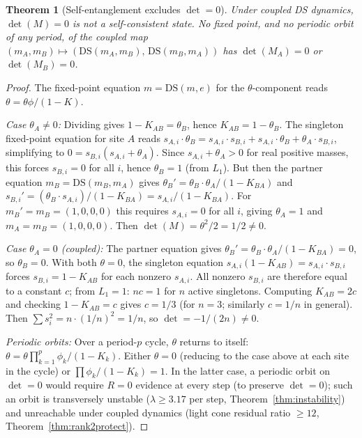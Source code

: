 \documentclass[11pt,a4paper]{article}
\newtheorem{theorem}{Theorem}[section]
\theoremstyle{definition}
\theoremstyle{remark}
\begin{document}
\begin{theorem}[Self-entanglement excludes $\det=0$]\label{thm:selfentangle}
Under coupled DS dynamics, $\det(M)=0$ is not a self-consistent state. No fixed point, and no periodic orbit of any period, of the coupled map $(m_A,m_B)\mapsto(\mathrm{DS}(m_A,m_B),\,\mathrm{DS}(m_B,m_A))$ has $\det(M_A)=0$ or $\det(M_B)=0$.
\end{theorem}

\begin{proof}
The fixed-point equation $m=\mathrm{DS}(m,e)$ for the $\theta$-component reads $\theta=\theta\phi/(1-K)$.

\emph{Case $\theta_A\neq 0$:} Dividing gives $1-K_{AB}=\theta_B$, hence $K_{AB}=1-\theta_B$. The singleton fixed-point equation for site $A$ reads $s_{A,i}\cdot\theta_B=s_{A,i}\cdot s_{B,i}+s_{A,i}\cdot\theta_B+\theta_A\cdot s_{B,i}$, simplifying to $0=s_{B,i}(s_{A,i}+\theta_A)$. Since $s_{A,i}+\theta_A>0$ for real positive masses, this forces $s_{B,i}=0$ for all $i$, hence $\theta_B=1$ (from $L_1$). But then the partner equation $m_B=\mathrm{DS}(m_B,m_A)$ gives $\theta_B'=\theta_B\cdot\theta_A/(1-K_{BA})$ and $s_{B,i}'=(\theta_B\cdot s_{A,i})/(1-K_{BA})=s_{A,i}/(1-K_{BA})$. For $m_B'=m_B=(1,0,0,0)$ this requires $s_{A,i}=0$ for all $i$, giving $\theta_A=1$ and $m_A=m_B=(1,0,0,0)$. Then $\det(M)=\theta^2/2=1/2\neq 0$.

\emph{Case $\theta_A=0$ (coupled):} The partner equation gives $\theta_B'=\theta_B\cdot\theta_A/(1-K_{BA})=0$, so $\theta_B=0$. With both $\theta=0$, the singleton equation $s_{A,i}(1-K_{AB})=s_{A,i}\cdot s_{B,i}$ forces $s_{B,i}=1-K_{AB}$ for each nonzero $s_{A,i}$. All nonzero $s_{B,i}$ are therefore equal to a constant $c$; from $L_1=1$: $nc=1$ for $n$ active singletons. Computing $K_{AB}=2c$ and checking $1-K_{AB}=c$ gives $c=1/3$ (for $n=3$; similarly $c=1/n$ in general). Then $\sum s_i^2 = n\cdot(1/n)^2=1/n$, so $\det=-1/(2n)\neq 0$.

\emph{Periodic orbits:} Over a period-$p$ cycle, $\theta$ returns to itself: $\theta=\theta\prod_{k=1}^{p}\phi_k/(1-K_k)$. Either $\theta=0$ (reducing to the case above at each site in the cycle) or $\prod\phi_k/(1-K_k)=1$. In the latter case, a periodic orbit on $\det=0$ would require $R=0$ evidence at every step (to preserve $\det=0$); such an orbit is transversely unstable ($\lambda\geq 3.17$ per step, Theorem~\ref{thm:instability}) and unreachable under coupled dynamics (light cone residual ratio $\geq 12$, Theorem~\ref{thm:rank2protect}).
\end{proof}
\end{document}

